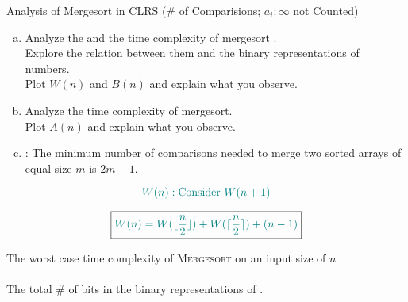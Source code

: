 
\begin{frame}{}

  \begin{columns}
  \end{columns}
\end{frame}

\begin{frame}{}
  \begin{exampleblock}{Analysis of Mergesort in CLRS (\# of Comparisions; $a_i : \infty$ not Counted)}
    \begin{enumerate}[(a)]
      \setlength{\itemsep}{5pt}
      \item Analyze the  and the  
	time complexity of mergesort . \\
	Explore the relation between them and the binary representations of numbers. \\
	Plot $W(n)$ and $B(n)$ and explain what you observe.
      \item Analyze the  time complexity of mergesort. \\
	Plot $A(n)$ and explain what you observe.
      \item {}: 
	The minimum number of comparisons needed to merge two sorted arrays of equal size $m$ is $2m - 1$.
    \end{enumerate}
  \end{exampleblock}

  \pause
  \[
    \textcolor{teal}{W(n): \text{Consider } W(n+1)}
  \]
\end{frame}

\begin{frame}{}
  \[
    \boxed{\textcolor{teal}{W(n) = W(\lfloor \frac{n}{2} \rfloor) + W(\lceil \frac{n}{2} \rceil) + (n-1)}}
  \]

  \pause
  \vspace{0.30cm}
  \begin{theorem}
    \begin{center}
      The worst case time complexity of \textsc{Mergesort} on an input size of $n$ \\
      \red{\bf $=$} \\
      The total \# of bits in the binary representations of .
    \end{center}
  \end{theorem}
\end{frame}

